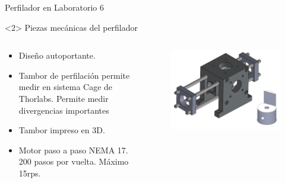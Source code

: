 \begin{frame}{Perfilador en Laboratorio 6}
    \begin{onlyenv}<2>
        Piezas mecánicas del perfilador
        \begin{columns}[c]
            \begin{column}{.5\textwidth}
                \begin{itemize}
                \item Diseño autoportante.
                \item Tambor de perfilación permite medir en sistema Cage de Thorlabs. Permite medir divergencias importantes
                \item Tambor impreso en 3D.
                \item Motor paso a paso NEMA 17. 200 pasos por vuelta. Máximo 15rps. 
                \end{itemize}
            \end{column}
            \begin{column}{0.5\textwidth}
                \begin{figure}
                \centering
                \includegraphics[width=\textwidth]{fig/perfilador/soporte_labo6}
                \label{fig:pieza}
                \end{figure}
            \end{column}
        \end{columns}
    \end{onlyenv}


\end{frame}
